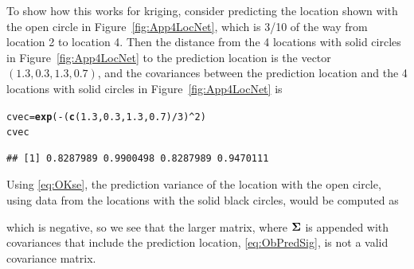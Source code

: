 \documentclass[11pt, titlepage]{article}\usepackage[]{graphicx}\usepackage[]{color}
\makeatletter
\newcommand{\hlnum}[1]{\textcolor[rgb]{0.686,0.059,0.569}{#1}}%
\newcommand{\hlopt}[1]{\textcolor[rgb]{0,0,0}{#1}}%
\newcommand{\hlstd}[1]{\textcolor[rgb]{0.345,0.345,0.345}{#1}}%
\newcommand{\hlkwb}[1]{\textcolor[rgb]{0.69,0.353,0.396}{#1}}%
\newcommand{\hlkwd}[1]{\textcolor[rgb]{0.737,0.353,0.396}{\textbf{#1}}}%
\newenvironment{kframe}{%
 \def\at@end@of@kframe{}%
 \ifinner\ifhmode%
  \def\at@end@of@kframe{\end{minipage}}%
  \begin{minipage}{\columnwidth}%
 \fi\fi%
 \def\FrameCommand##1{\hskip\@totalleftmargin \hskip-\fboxsep
 \colorbox{shadecolor}{##1}\hskip-\fboxsep
     \hskip-\linewidth \hskip-\@totalleftmargin \hskip\columnwidth}%
 \MakeFramed {\advance\hsize-\width
   \@totalleftmargin\z@ \linewidth\hsize
   \@setminipage}}%
 {\par\unskip\endMakeFramed%
 \at@end@of@kframe}
\newenvironment{knitrout}{}{} %
\makeatother
\begin{document}
\begin{spacing}{1.9}
To show how this works for kriging, consider predicting the location shown with the open circle in Figure~\ref{fig:App4LocNet}, which is 3/10 of the way from location 2 to location 4.  Then the distance from the 4 locations with solid circles in Figure~\ref{fig:App4LocNet} to the prediction location is the vector $(1.3, 0.3, 1.3, 0.7)$, and the covariances between the prediction location and the 4 locations with solid circles in Figure~\ref{fig:App4LocNet} is 
\begin{singlespace}
\begin{knitrout}
\color{fgcolor}\begin{kframe}
\begin{alltt}
\hlstd{cvec} \hlkwb{=} \hlkwd{exp}\hlstd{(}\hlopt{-}\hlstd{(}\hlkwd{c}\hlstd{(}\hlnum{1.3}\hlstd{,} \hlnum{0.3}\hlstd{,} \hlnum{1.3}\hlstd{,} \hlnum{0.7}\hlstd{)}\hlopt{/}\hlnum{3}\hlstd{)}\hlopt{^}\hlnum{2}\hlstd{)}
\hlstd{cvec}
\end{alltt}
\begin{verbatim}
## [1] 0.8287989 0.9900498 0.8287989 0.9470111
\end{verbatim}
\end{kframe}
\end{knitrout}
\end{singlespace}
\noindent Using \ref{eq:OKse}, the prediction variance of the location with the open circle, using data from the locations with the solid black circles, would be computed as
\noindent which is negative, so we see that the larger matrix, where $\mbox{\boldmath $\Sigma$}$ is appended with covariances that include the prediction location, \ref{eq:ObPredSig}, is not a valid covariance matrix. 



\end{spacing}
\end{document}
